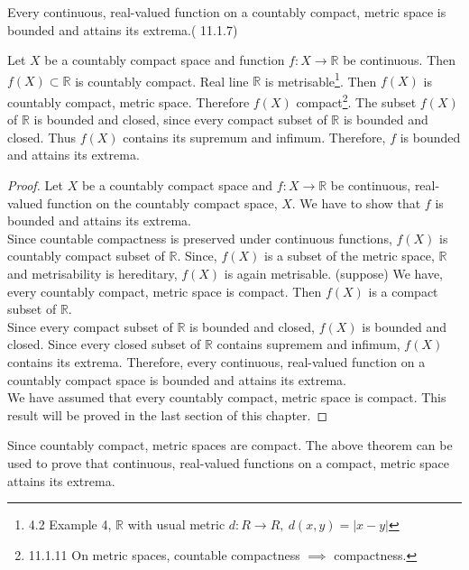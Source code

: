 \begin{theorem}
	Every continuous, real-valued function on a countably compact, metric space is bounded and attains its extrema.(\cite{joshi} 11.1.7)
\end{theorem}
\begin{synopsis}
	Let $X$ be a countably compact space and function $f : X \to \mathbb{R}$ be continuous. Then $f(X) \subset \mathbb{R}$ is countably compact. Real line $\mathbb{R}$ is metrisable\footnote{\cite{joshi} 4.2 Example 4, $\mathbb{R}$ with usual metric $d:R \to R,\ d(x,y) = |x-y|$}. Then $f(X)$ is countably compact, metric space. Therefore $f(X)$ compact\footnote{\cite{joshi} 11.1.11 On metric spaces, countable compactness $\implies$ compactness.}. The subset $f(X)$ of $\mathbb{R}$ is bounded and closed, since every compact subset of $\mathbb{R}$ is bounded and closed. Thus $f(X)$ contains its supremum and infimum. Therefore, $f$ is bounded and attains its extrema.
\end{synopsis}
\begin{proof}
	Let $X$ be a countably compact space and $f : X \to \mathbb{R}$ be continuous, real-valued function on the countably compact space, $X$. We have to show that $f$ is bounded and attains its extrema.\\
	
	Since countable compactness is preserved under continuous functions, $f(X)$ is countably compact subset of $\mathbb{R}$. Since, $f(X)$ is a subset of the metric space, $\mathbb{R}$ and metrisability is hereditary, $f(X)$ is again metrisable. (suppose) We have, every countably compact, metric space is compact. Then $f(X)$ is a compact subset of $\mathbb{R}$.\\

	Since every compact subset of $\mathbb{R}$ is bounded and closed, $f(X)$ is bounded and closed. Since every closed subset of $\mathbb{R}$ contains supremem and infimum, $f(X)$ contains its extrema. Therefore, every continuous, real-valued function on a countably compact space is bounded and attains its extrema.\\

	We have assumed that every countably compact, metric space is compact. This result will be proved in the last section of this chapter.
\end{proof}

\begin{remark}
	Since countably compact, metric spaces are compact. The above theorem can be used to prove that continuous, real-valued functions on a compact, metric space attains its extrema.
\end{remark}

